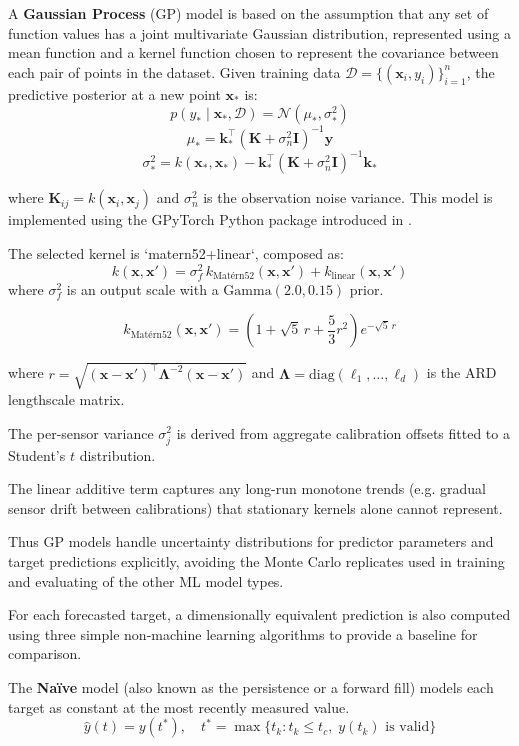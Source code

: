 \documentclass[resources,article,submit,pdftex,moreauthors]{Definitions/mdpi}
\begin{document}
A \textbf{Gaussian Process} (GP) model is based on the assumption that any set of function values has a joint multivariate Gaussian distribution, represented using a mean function and a kernel function chosen to represent the covariance between each pair of points in the dataset.  Given training data $\mathcal{D} = \{(\mathbf{x}_i, y_i)\}_{i=1}^{n}$, the predictive posterior at
a new point $\mathbf{x}_*$ is: 
$$p(y_* \mid \mathbf{x}_*, \mathcal{D}) = \mathcal{N}(\mu_*, \sigma_*^2)$$ 
$$\mu_* = \mathbf{k}_*^\top (\mathbf{K} + \sigma_n^2 \mathbf{I})^{-1} \mathbf{y}$$ 
$$\sigma_*^2 = k(\mathbf{x}_*, \mathbf{x}_*) - \mathbf{k}_*^\top (\mathbf{K} + \sigma_n^2 \mathbf{I})^{-1} \mathbf{k}_*$$ 

where $\mathbf{K}_{ij} = k(\mathbf{x}_i, \mathbf{x}_j)$ and $\sigma_n^2$ is the observation noise variance.  This model is implemented using the GPyTorch Python package introduced in \cite{Gardner2018}. 

The selected kernel is `matern52+linear`, composed as: $$k(\mathbf{x}, \mathbf{x}') = \sigma_f^2\, k_{\text{Matérn52}}(\mathbf{x}, \mathbf{x}') + k_{\text{linear}}(\mathbf{x}, \mathbf{x}')$$ where $\sigma_f^2$ is an output scale with a $\text{Gamma}(2.0, 0.15)$ prior.

$$k_{\text{Matérn52}}(\mathbf{x}, \mathbf{x}') = \left(1 + \sqrt{5}\,r + \frac{5}{3}r^2\right) e^{-\sqrt{5}\,r}$$

where $r = \sqrt{(\mathbf{x}-\mathbf{x}')^\top \boldsymbol{\Lambda}^{-2} (\mathbf{x}-\mathbf{x}')}$
and $\boldsymbol{\Lambda} = \text{diag}(\ell_1, \ldots, \ell_d)$ is the ARD
lengthscale matrix.

The per-sensor variance $\sigma_j^2$ is derived from aggregate calibration offsets fitted to a Student's $t$ distribution. 

The linear additive term captures any long-run monotone trends (e.g. gradual sensor drift between calibrations) that stationary kernels alone cannot represent. 

Thus GP models handle uncertainty distributions for predictor parameters and target predictions explicitly, avoiding the Monte Carlo replicates used in training and evaluating of the other ML model types.

For each forecasted target, a dimensionally equivalent prediction is also computed using three simple non-machine learning algorithms to provide a baseline for comparison. 

The \textbf{Na\"ive} model (also known as the persistence or a forward fill) models each target as constant at the most recently measured value.   $$\hat{y}(t) = y(t^{*}), \quad t^{*} = \max\{t_k : t_k \leq t_c,\; y(t_k) \text{ is valid}\}$$
\end{document}
